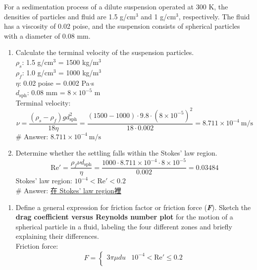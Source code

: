 \documentclass[12pt,a4paper]{article}
\begin{document}
\begin{problems}
For a sedimentation process of a dilute suspension operated at 300 K, the densities of particles and fluid are 1.5 g/cm$^3$ and 1 g/cm$^3$, respectively. The fluid has a viscosity of 0.02 poise, and the suspension consists of spherical particles with a diameter of 0.08 mm.
\begin{enumerate}
    \item Calculate the terminal velocity of the suspension particles.\\
    $\rho_s$: 1.5 g/cm$^3$ = 1500 kg/m$^3$\\
    $\rho_f$: 1.0 g/cm$^3$ = 1000 kg/m$^3$\\
    $\eta$: 0.02 poise = 0.002 Pa$\cdot$s\\
    $d_{\text{sph}}$: 0.08 mm = $8\times 10^{-5}$ m\\
    Terminal velocity:
    \begin{equation}
        \nu = \frac{\left(\rho_s - \rho_f\right)gd_{\text{sph}}^2}{18\eta} =  
        \frac{(1500-1000)\cdot 9.8 \cdot \left(8\times 10^{-5}\right)^2}{18\cdot 0.002} = 8.711\times 10^{-4}~\text{m/s} 
    \end{equation}
    \# Answer: \underline{$8.711\times 10^{-4}~\text{m/s}$}
    \item Determine whether the settling falls within the Stokes' law region.
    \begin{equation}
        \text{Re}' = \frac{\rho_f \nu d_{\text{sph}}}{\eta} = \frac{1000 \cdot 8.711\times 10^{-4}\cdot 8\times 10^{-5}}{0.002} = 0.03484
    \end{equation}
    Stokes' law region: $10^{-4}< \text{Re}'<0.2$\\
    \# Answer: \underline{在 Stokes' law region裡}
\end{enumerate}
\vspace{0.2cm}
\begin{enumerate}
    \item Define a general expression for friction factor or friction force (\textit{\textbf{F}}).
    Sketch the \textbf{drag coefficient versus Reynolds number plot} for the motion of a spherical particle in a fluid, labeling the four different zones and briefly explaining their differences.\\
    Friction force:
    \begin{equation}
        F = \begin{cases}
            3\pi \mu d u & 10^{-4}< \text{Re}' \leq 0.2\\

\end{cases}
\end{equation}
\end{enumerate}
\end{problems}
\end{document}
